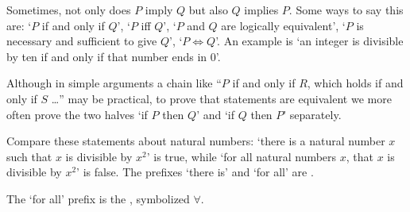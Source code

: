 




Sometimes, not only does \( P \) imply \( Q \) but
also \( Q \) implies \( P \). 
Some ways to say this are:
`\( P \) if and only if
\( Q \)', `\( P \) iff \( Q \)', `\( P \) and \( Q \) are logically
equivalent', `\( P \) is necessary and sufficient to give \( Q \)',
`\( P\iff Q \)'.
An example is `an integer is divisible by ten if and only if  
that number ends in $0$'.

Although in simple arguments a chain like 
``\( P \) if and only if $R$, which holds if and only if $S$ \ldots''
may be practical, to prove that statements are equivalent we more often
prove the two halves
`if \( P \) then \( Q \)' and `if \( Q \) then \( P \)' separately.








%
Compare these statements about natural numbers:
`there is a natural number \( x \) such that \( x \) is
divisible by \( x^2 \)' is true, while
`for all natural numbers \( x \), 
that \( x \) is divisible by \( x^2 \)' is false.
The prefixes `there is' and `for all' 
are .

The `for all' prefix is the 
, 
symbolized \( \forall \).

